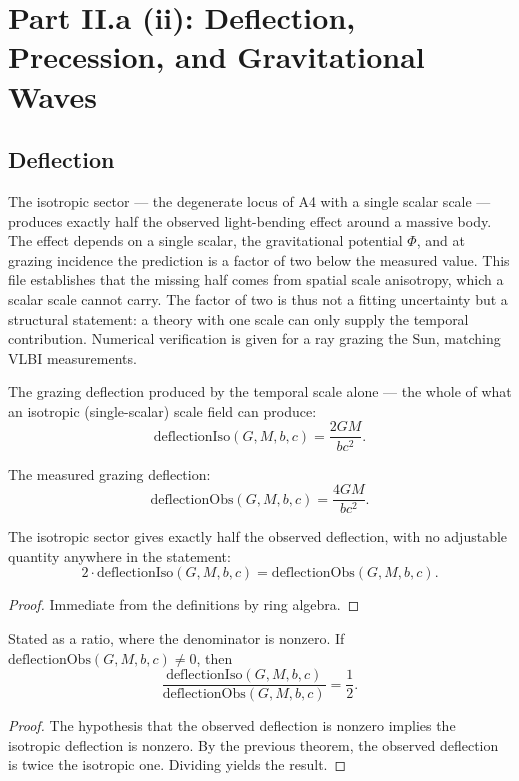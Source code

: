 \section{Part II.a (ii): Deflection, Precession, and Gravitational Waves}

\subsection{Deflection}

The isotropic sector — the degenerate locus of A4 with a single scalar scale — produces exactly half the observed light-bending effect around a massive body. The effect depends on a single scalar, the gravitational potential $\Phi$, and at grazing incidence the prediction is a factor of two below the measured value. This file establishes that the missing half comes from spatial scale anisotropy, which a scalar scale cannot carry. The factor of two is thus not a fitting uncertainty but a structural statement: a theory with one scale can only supply the temporal contribution. Numerical verification is given for a ray grazing the Sun, matching VLBI measurements.

\begin{definition}
The grazing deflection produced by the temporal scale alone — the whole of what an isotropic (single-scalar) scale field can produce:
\[
\text{deflectionIso}(G, M, b, c) = \frac{2GM}{bc^2}.
\]
\end{definition}

\begin{definition}
The measured grazing deflection:
\[
\text{deflectionObs}(G, M, b, c) = \frac{4GM}{bc^2}.
\]
\end{definition}

\begin{theorem}
The isotropic sector gives exactly half the observed deflection, with no adjustable quantity anywhere in the statement:
\[
2 \cdot \text{deflectionIso}(G, M, b, c) = \text{deflectionObs}(G, M, b, c).
\]
\begin{proof}
Immediate from the definitions by ring algebra.
\end{proof}
\end{theorem}

\begin{theorem}
Stated as a ratio, where the denominator is nonzero. If $\text{deflectionObs}(G, M, b, c) \neq 0$, then
\[
\frac{\text{deflectionIso}(G, M, b, c)}{\text{deflectionObs}(G, M, b, c)} = \frac{1}{2}.
\]
\begin{proof}
The hypothesis that the observed deflection is nonzero implies the isotropic deflection is nonzero. By the previous theorem, the observed deflection is twice the isotropic one. Dividing yields the result.
\end{proof}
\end{theorem}

